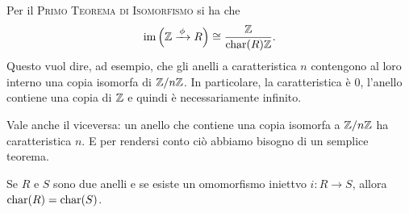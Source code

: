 Per il {\scshape Primo Teorema di Isomorfismo} si ha che 
\[\operatorname{im}\left(\mathbb{Z} \xrightarrow{\,\phi\,} R\right) \cong \frac{\mathbb{Z}}{\operatorname{char}(R)\mathbb{Z}} .\]
Questo vuol dire, ad esempio, che gli anelli a caratteristica \(n\) contengono al loro interno una copia isomorfa di \(\mathbb{Z}/n\mathbb{Z}\). In particolare, la caratteristica è \(0\), l'anello contiene una copia di \(\mathbb{Z}\) e quindi è necessariamente infinito.



Vale anche il viceversa: un anello che contiene una copia isomorfa a \(\mathbb{Z}/n\mathbb{Z}\) ha caratteristica \(n\). E per rendersi conto ciò abbiamo bisogno di un semplice teorema.


\begin{prop}\label{prop:ConservazioneCaratteristica}
Se \(R\) e \(S\) sono due anelli e se esiste un omomorfismo iniettvo \(i : R \to S\), allora \(\operatorname{char}(R)=\operatorname{char}(S)\).
\end{prop}


